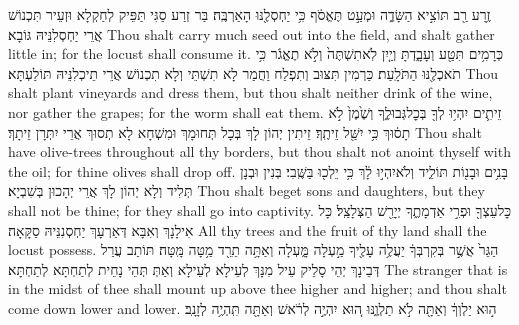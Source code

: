 {זֶ֥רַע רַ֖ב תּוֹצִ֣יא הַשָּׂדֶ֑ה וּמְעַ֣ט תֶּאֱסֹ֔ף כִּ֥י יַחְסְלֶ֖נּוּ הָאַרְבֶּֽה׃}
{בַּר זְרַע סַגִּי תַּפֵּיק לְחַקְלָא וּזְעֵיר תִּכְנוֹשׁ אֲרֵי יַחְסְלִנֵּיהּ גּוֹבָא׃}
{Thou shalt carry much seed out into the field, and shalt gather little in; for the locust shall consume it.}{}
{כְּרָמִ֥ים תִּטַּ֖ע וְעָבָ֑דְתָּ וְיַ֤יִן לֹֽא\maqqaf תִשְׁתֶּה֙ וְלֹ֣א תֶאֱגֹ֔ר כִּ֥י תֹאכְלֶ֖נּוּ הַתֹּלָֽעַת׃}
{כַּרְמִין תִּצּוּב וְתִפְלַח וַחֲמַר לָא תִשְׁתֵּי וְלָא תִכְנוֹשׁ אֲרֵי תֵיכְלִנֵּיהּ תּוֹלַעְתָּא׃}
{Thou shalt plant vineyards and dress them, but thou shalt neither drink of the wine, nor gather the grapes; for the worm shall eat them.}{}
{זֵיתִ֛ים יִהְי֥וּ לְךָ֖ בְּכׇל\maqqaf גְּבוּלֶ֑ךָ וְשֶׁ֙מֶן֙ לֹ֣א תָס֔וּךְ כִּ֥י יִשַּׁ֖ל זֵיתֶֽךָ׃}
{זֵיתִין יְהוֹן לָךְ בְּכָל תְּחוּמָךְ וּמִשְׁחָא לָא תְסוּךְ אֲרֵי יִתְּרָן זֵיתָךְ׃}
{Thou shalt have olive-trees throughout all thy borders, but thou shalt not anoint thyself with the oil; for thine olives shall drop off.}{}
{בָּנִ֥ים וּבָנ֖וֹת תּוֹלִ֑יד וְלֹא\maqqaf יִהְי֣וּ לָ֔ךְ כִּ֥י יֵלְכ֖וּ בַּשֶּֽׁבִי׃}
{בְּנִין וּבְנָן תְּלִיד וְלָא יְהוֹן לָךְ אֲרֵי יְהָכוּן בְּשִׁבְיָא׃}
{Thou shalt beget sons and daughters, but they shall not be thine; for they shall go into captivity.}{}
{כׇּל\maqqaf עֵצְךָ֖ וּפְרִ֣י אַדְמָתֶ֑ךָ יְיָרֵ֖שׁ הַצְּלָצַֽל׃}
{כָּל אִילָנָךְ וְאִבָּא דְּאַרְעָךְ יַחְסְנִנֵּיהּ סַקָּאָה׃}
{All thy trees and the fruit of thy land shall the locust possess.}{}
{הַגֵּר֙ אֲשֶׁ֣ר בְּקִרְבְּךָ֔ יַעֲלֶ֥ה עָלֶ֖יךָ מַ֣עְלָה מָּ֑עְלָה וְאַתָּ֥ה תֵרֵ֖ד מַ֥טָּה מָּֽטָּה׃}
{תּוֹתַב עֲרַל דְּבֵינָךְ יְהֵי סָלֵיק עֵיל מִנָּךְ לְעֵילָא לְעֵילָא וְאַתְּ תְּהֵי נָחֵית לְתַחְתָּא לְתַחְתָּא׃}
{The stranger that is in the midst of thee shall mount up above thee higher and higher; and thou shalt come down lower and lower.}{}
{ה֣וּא יַלְוְךָ֔ וְאַתָּ֖ה לֹ֣א תַלְוֶ֑נּוּ ה֚וּא יִהְיֶ֣ה לְרֹ֔אשׁ וְאַתָּ֖ה תִּֽהְיֶ֥ה לְזָנָֽב׃}
